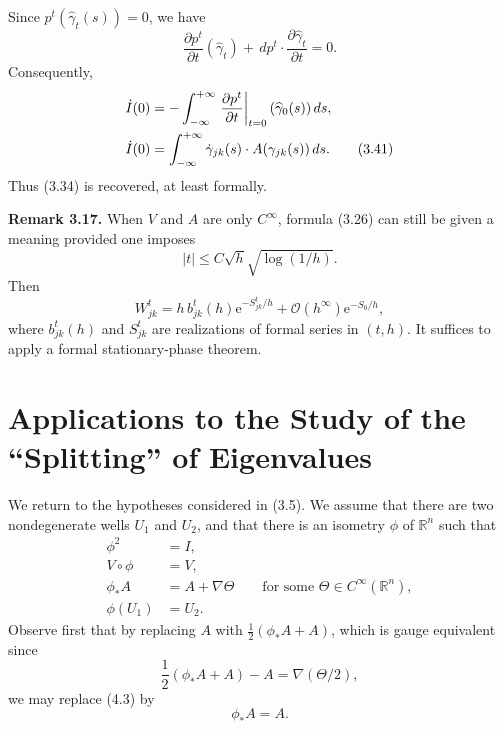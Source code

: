 \documentclass[11pt]{article}
\newcommand{\R}{\mathbb{R}}
\newcommand{\OO}{\mathcal O}
\newcommand{\dd}{\,d}
\newcommand{\e}{\mathrm{e}}
\begin{document}
Since $p^t(\widehat\gamma_t(s))=0$, we have
\[
\frac{\partial p^t}{\partial t}(\widehat\gamma_t)
+\dd p^t\cdot\frac{\partial\widehat\gamma_t}{\partial t}=0.
\]
Consequently,
\begin{align}
\dot I(0)
&=-\int_{-\infty}^{+\infty}
\left.\frac{\partial p^t}{\partial t}\right|_{t=0}
(\widehat\gamma_0(s))\dd s,\notag\\
\dot I(0)
&=\int_{-\infty}^{+\infty}
\dot\gamma_{jk}(s)\cdot A(\gamma_{jk}(s))\dd s.
\tag{3.41}
\end{align}
Thus (3.34) is recovered, at least formally.

\medskip
\noindent\textbf{Remark 3.17.}
When $V$ and $A$ are only $C^\infty$, formula (3.26) can still be given a meaning provided one imposes
\[
|t|\le C\sqrt{h}\sqrt{\log(1/h)}.
\]
Then
\[
W_{jk}^t=h\,b_{jk}^t(h)\e^{-S_{jk}^t/h}
+\OO(h^\infty)\e^{-S_0/h},
\]
where $b_{jk}^t(h)$ and $S_{jk}^t$ are realizations of formal series in $(t,h)$. It suffices to apply a formal stationary-phase theorem.

\section{Applications to the Study of the ``Splitting'' of Eigenvalues}

We return to the hypotheses considered in (3.5). We assume that there are two nondegenerate wells $U_1$ and $U_2$, and that there is an isometry $\phi$ of $\R^n$ such that
\begin{align}
\phi^2&=I, \tag{4.1}\\
V\circ\phi&=V, \tag{4.2}\\
\phi_*A&=A+\nabla\Theta
\qquad\text{for some }\Theta\in C^\infty(\R^n), \tag{4.3}\\
\phi(U_1)&=U_2. \tag{4.4}
\end{align}
Observe first that by replacing $A$ with
$\frac12(\phi_*A+A)$, which is gauge equivalent since
\[
\frac12(\phi_*A+A)-A=\nabla(\Theta/2),
\]
we may replace (4.3) by
\[
\phi_*A=A. \tag{4.3$'$}
\]
\end{document}
